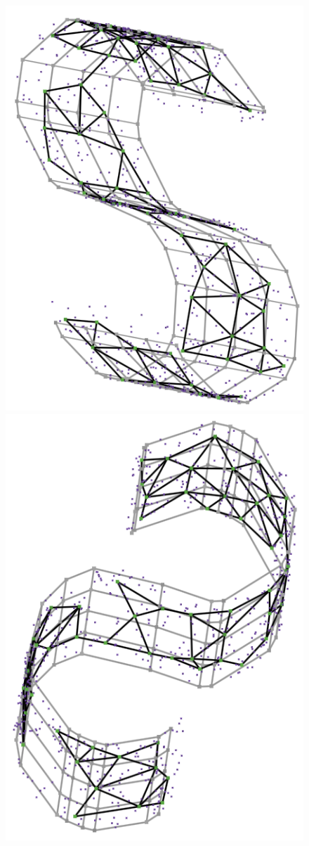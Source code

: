 \documentclass[
  12pt]{article}
\begin{document}
\begin{figure}[H]
%
\begin{minipage}{0.25\linewidth}
\includegraphics{figures/scurve/sc_2.png}\end{minipage}%
%
\begin{minipage}{0.25\linewidth}
\includegraphics{figures/scurve/sc_3.png}\end{minipage}%


\end{figure}
\end{document}
